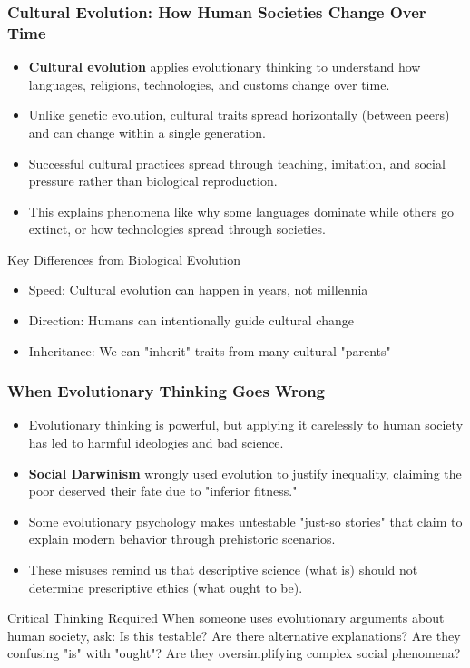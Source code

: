 \documentclass{beamer}
\begin{document}
	\begin{frame}
		\frametitle{Cultural Evolution: How Human Societies Change Over Time}
		\begin{itemize}
			\item \textbf{Cultural evolution} applies evolutionary thinking to understand how languages, religions, technologies, and customs change over time.
			\item Unlike genetic evolution, cultural traits spread horizontally (between peers) and can change within a single generation.
			\item Successful cultural practices spread through teaching, imitation, and social pressure rather than biological reproduction.
			\item This explains phenomena like why some languages dominate while others go extinct, or how technologies spread through societies.
		\end{itemize}
		\begin{block}{Key Differences from Biological Evolution}
			\begin{itemize}
				\item Speed: Cultural evolution can happen in years, not millennia
				\item Direction: Humans can intentionally guide cultural change
				\item Inheritance: We can "inherit" traits from many cultural "parents"
			\end{itemize}
		\end{block}
	\end{frame}
	
	\begin{frame}
		\frametitle{When Evolutionary Thinking Goes Wrong}
		\begin{itemize}
			\item Evolutionary thinking is powerful, but applying it carelessly to human society has led to harmful ideologies and bad science.
			\item \textbf{Social Darwinism} wrongly used evolution to justify inequality, claiming the poor deserved their fate due to "inferior fitness."
			\item Some evolutionary psychology makes untestable "just-so stories" that claim to explain modern behavior through prehistoric scenarios.
			\item These misuses remind us that descriptive science (what is) should not determine prescriptive ethics (what ought to be).
		\end{itemize}
		\begin{alertblock}{Critical Thinking Required}
			When someone uses evolutionary arguments about human society, ask: Is this testable? Are there alternative explanations? Are they confusing "is" with "ought"? Are they oversimplifying complex social phenomena?
		\end{alertblock}
	\end{frame}
	
\end{document}
